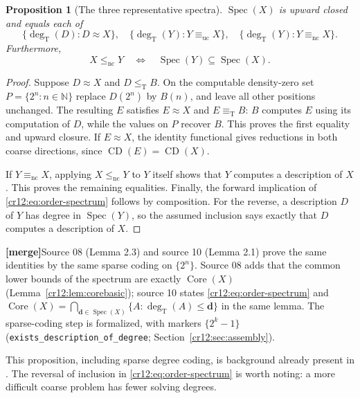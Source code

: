 \documentclass[11pt,letterpaper]{article}
\theoremstyle{plain}
\newtheorem{proposition}[theorem]{Proposition}
\theoremstyle{definition}
\theoremstyle{remark}
\numberwithin{equation}{section}
\newcommand{\N}{\mathbb N}
\newcommand{\leT}{\leq_{\mathrm T}}
\newcommand{\eqT}{\equiv_{\mathrm T}}
\newcommand{\lenc}{\leq_{\mathrm{nc}}}
\newcommand{\equc}{\equiv_{\mathrm{uc}}}
\newcommand{\eqnc}{\equiv_{\mathrm{nc}}}
\newcommand{\Core}{\operatorname{Core}}
\newcommand{\CD}{\operatorname{CD}}
\newcommand{\Spec}{\operatorname{Spec}}
\newcommand{\degT}{\deg_{\mathrm T}}
\newcommand{\mergenote}[1]{\par\smallskip\noindent
 {\small\textsf{\textbf{[merge]}}\enspace #1}\par\smallskip}
\begin{document}
\begin{proposition}[The three representative spectra]\label{cr12:prop:spectra}
$\Spec(X)$ is upward closed and equals each of
\[
 \{\degT(D):D\approx X\},\quad
 \{\degT(Y):Y\equc X\},\quad
 \{\degT(Y):Y\eqnc X\}.
\]
Furthermore,
\begin{equation}\label{cr12:eq:order-spectrum}
 X\lenc Y\quad\Longleftrightarrow\quad\Spec(Y)\subseteq\Spec(X).
\end{equation}
\end{proposition}
\begin{proof}
Suppose $D\approx X$ and $D\leT B$. On the computable density-zero set
$P=\{2^n:n\in\N\}$ replace $D(2^n)$ by $B(n)$, and leave all other positions
unchanged. The resulting $E$ satisfies $E\approx X$ and $E\eqT B$: $B$ computes
$E$ using its computation of $D$, while the values on $P$ recover $B$.
This proves the first equality and upward closure. If $E\approx X$, the identity
functional gives reductions in both coarse directions, since
$\CD(E)=\CD(X)$.

If $Y\eqnc X$, applying $X\lenc Y$ to $Y$ itself shows that $Y$ computes a
description of $X$. This proves the remaining equalities. Finally, the forward
implication of \eqref{cr12:eq:order-spectrum} follows by composition. For the reverse,
a description $D$ of $Y$ has degree in $\Spec(Y)$, so the assumed inclusion
says exactly that $D$ computes a description of $X$.
\end{proof}
\mergenote{Source 08 (Lemma 2.3) and source 10 (Lemma 2.1) prove the same identities by
the same sparse coding on $\{2^n\}$. Source 08 adds that the common lower bounds of
the spectrum are exactly $\Core(X)$ (Lemma~\ref{cr12:lem:corebasic}); source 10
states \eqref{cr12:eq:order-spectrum} and
$\Core(X)=\bigcap_{\mathbf d\in\Spec(X)}\{A:\degT(A)\le\mathbf d\}$ in the same
lemma. The sparse-coding step is formalized, with markers $\{2^k-1\}$
(\texttt{exists\_description\_of\_degree}; Section~\ref{cr12:sec:assembly}).}

This proposition, including sparse degree coding, is background already present
in \cite{Repo}. The reversal of inclusion in \eqref{cr12:eq:order-spectrum} is worth
noting: a more difficult coarse problem has fewer solving degrees.
\end{document}
